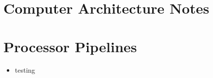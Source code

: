 \documentclass[a4paper, 12pt]{article}
\begin{document}
\section*{Computer Architecture Notes}

\section*{Processor Pipelines}
\begin{itemize}
  \item testing
\end{itemize}
\end{document}

